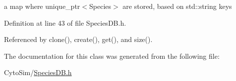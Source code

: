 a map where unique\-\_\-ptr$<$\-Species$>$ are stored, based on std\-::string keys 



Definition at line 43 of file Species\-D\-B.\-h.



Referenced by clone(), create(), get(), and size().



The documentation for this class was generated from the following file\-:\begin{DoxyCompactItemize}
\item 
Cyto\-Sim/\hyperlink{SpeciesDB_8h}{Species\-D\-B.\-h}\end{DoxyCompactItemize}
